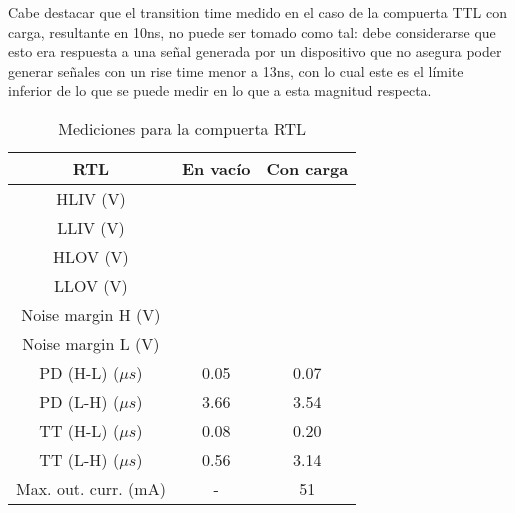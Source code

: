 \documentclass[../../e3_tp2_main.tex]{subfiles}
\begin{document}
Cabe destacar que el transition time medido en el caso de la compuerta TTL con carga, resultante en 10ns, no puede ser tomado como tal: debe considerarse que esto era respuesta a una se\~nal generada por un dispositivo que no asegura poder generar se\~nales con un rise time menor a 13ns, con lo cual este es el l\'imite inferior de lo que se puede medir en lo que a esta magnitud respecta.\par


\begin{table}[H]
	\centering
	\begin{tabular}{|c|c|c|}
	\hline
        RTL                          				& En vac\'io	& Con carga \\ \hline \hline
	HLIV (V)                          			&                      &                   \\ \hline
	LLIV (V)                          			&                      &                    \\ \hline
	HLOV (V)                          			&                      &                                    \\ \hline
	LLOV (V)                          			&                      &                               \\ \hline
	Noise margin H (V)                     	&                      &                                \\ \hline
	Noise margin L (V)				&			&				\\ \hline
	PD (H-L) ($\mu s$)	& 0.05               & 0.07                        \\ \hline
	PD (L-H) ($\mu s$) 	& 3.66               & 3.54             \\ \hline
	TT (H-L) ($\mu s$)   	& 0.08               & 0.20                   \\ \hline
	TT (L-H) ($\mu s$)   	& 0.56               & 3.14                   \\ \hline
	Max. out. curr. (mA)       	& -                    & 51                     \\ \hline

	\end{tabular}
	
	\caption{Mediciones para la compuerta RTL}
	\label{table:1-mediciones-rtl}
\end{table}
\end{document}
